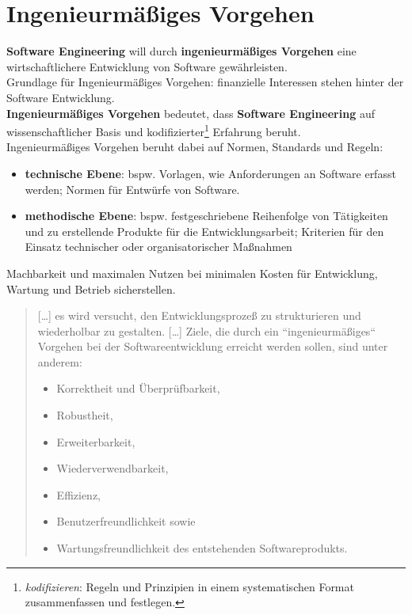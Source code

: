 \section{Ingenieurmäßiges Vorgehen}

\begin{tcolorbox}[title=Ingenieurmäßiges Vorgehen]
\textbf{Software Engineering} will durch \textbf{ingenieurmäßiges Vorgehen} eine wirtschaftlichere Entwicklung von Software gewährleisten.\\
Grundlage für Ingenieurmäßiges Vorgehen: finanzielle Interessen stehen hinter der Software Entwicklung.\\

\noindent
\textbf{Ingenieurmäßiges Vorgehen} bedeutet, dass \textbf{Software Engineering} auf wissenschaftlicher Basis und kodifizierter\footnote{
    \textit{kodifizieren}: Regeln und Prinzipien in einem systematischen Format zusammenfassen und festlegen.
} Erfahrung beruht.\\

\noindent
Ingenieurmäßiges Vorgehen beruht dabei auf Normen, Standards und Regeln:

\begin{itemize}
    \item\textbf{technische Ebene}: bspw. Vorlagen, wie Anforderungen an Software erfasst werden; Normen für Entwürfe von Software.
    \item \textbf{methodische Ebene}: bspw. festgeschriebene Reihenfolge von Tätigkeiten und zu erstellende Produkte für die Entwicklungsarbeit; Kriterien für den Einsatz technischer oder organisatorischer Maßnahmen
\end{itemize}
\end{tcolorbox}


\begin{tcolorbox}[title=Ziele des Ingenieurmäßigen Vorgehens]
Machbarkeit und maximalen Nutzen bei minimalen Kosten für Entwicklung, Wartung und Betrieb sicherstellen.\\

\blockquote[{\cite[2]{SR94}}]{
[\ldots] es wird versucht, den
Entwicklungsprozeß zu strukturieren und wiederholbar zu gestalten.
[\ldots]
Ziele, die durch ein ``ingenieurmäßiges`` Vorgehen bei der Softwareentwicklung erreicht werden sollen, sind unter anderem:
\begin{itemize}
    \item Korrektheit und Überprüfbarkeit,
    \item  Robustheit,
    \item  Erweiterbarkeit,
    \item  Wiederverwendbarkeit,
    \item  Effizienz,
    \item  Benutzerfreundlichkeit sowie
    \item  Wartungsfreundlichkeit des entstehenden Softwareprodukts.
\end{itemize}
}
\end{tcolorbox}